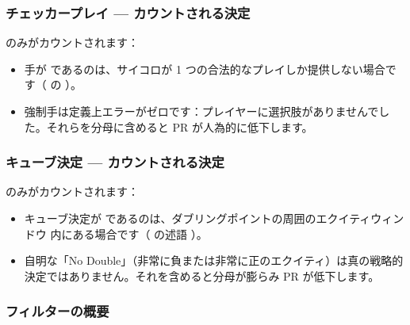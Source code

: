 \documentclass[letterpaper,10pt,dvipdfmx]{sphinxmanual}
\begin{document}
\subsubsection{チェッカープレイ — カウントされる決定}
\label{\detokenize{stats_parity:coups-de-pions-decisions-comptees}}
\sphinxAtStartPar
{} のみがカウントされます：
\begin{itemize}
\item {} 
\sphinxAtStartPar
手が  であるのは、サイコロが 1 つの合法的なプレイしか提供しない場合です（ の ）。

\item {} 
\sphinxAtStartPar
強制手は定義上エラーがゼロです：プレイヤーに選択肢がありませんでした。それらを分母に含めると PR が人為的に低下します。

\end{itemize}


\subsubsection{キューブ決定 — カウントされる決定}
\label{\detokenize{stats_parity:decisions-de-cube-decisions-comptees}}
\sphinxAtStartPar
{} のみがカウントされます：
\begin{itemize}
\item {} 
\sphinxAtStartPar
キューブ決定が  であるのは、ダブリングポイントの周囲のエクイティウィンドウ \sphinxcode{\sphinxupquote{{[}\sphinxhyphen{}0.16, +0.16{]}}} 内にある場合です（ の述語 ）。

\item {} 
\sphinxAtStartPar
自明な「No Double」（非常に負または非常に正のエクイティ）は真の戦略的決定ではありません。それを含めると分母が膨らみ PR が低下します。

\end{itemize}


\subsubsection{フィルターの概要}
\label{\detokenize{stats_parity:resume-du-filtre}}
\end{document}
